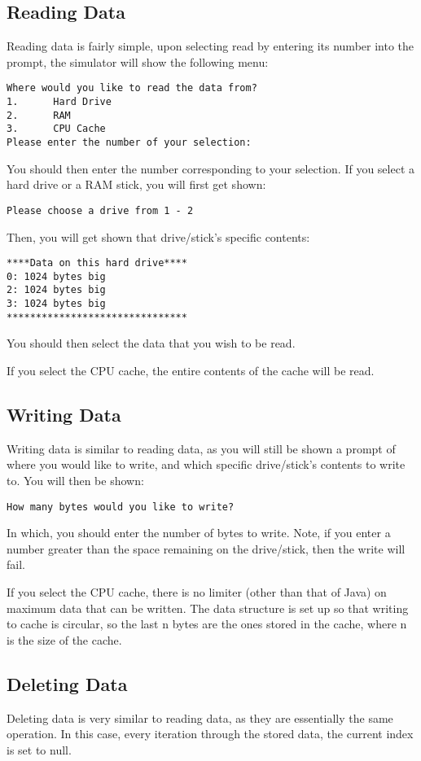 \documentclass[12pt]{article}
\newcommand{\singlespace}{
  \protect\renewcommand\baselinestretch{1.0}
  \protect\normalsize
}
\begin{document}
\subsection*{Reading Data}
Reading data is fairly simple, upon selecting read by entering its number into
the prompt, the simulator will show the following menu:
{\singlespace
\begin{verbatim}
Where would you like to read the data from?
1.      Hard Drive
2.      RAM
3.      CPU Cache
Please enter the number of your selection:
\end{verbatim}
}
You should then enter the number corresponding to your selection.
If you select a hard drive or a RAM stick, you will first get shown:
{\singlespace
\begin{verbatim}
Please choose a drive from 1 - 2
\end{verbatim}
}
Then, you will get shown that drive/stick's specific contents:
{\singlespace
\begin{verbatim}
****Data on this hard drive****
0: 1024 bytes big
2: 1024 bytes big
3: 1024 bytes big
*******************************
\end{verbatim}
}
You should then select the data that you wish to be read.

If you select the CPU cache, the entire contents of the cache will be read.

\subsection*{Writing Data}
Writing data is similar to reading data, as you will still be shown a prompt
of where you would like to write, and which specific drive/stick's contents to write to.
You will then be shown:
{\singlespace
\begin{verbatim}
How many bytes would you like to write?
\end{verbatim}
}
In which, you should enter the number of bytes to write. Note, if you enter a number greater
than the space remaining on the drive/stick, then the write will fail.

If you select the CPU cache, there is no limiter (other than that of Java) on maximum data
that can be written. The data structure is set up so that writing to cache is circular, so
the last n bytes are the ones stored in the cache, where n is the size of the cache.

\subsection*{Deleting Data}
Deleting data is very similar to reading data, as they are essentially the same operation.
In this case, every iteration through the stored data, the current index is set to null.
\end{document}
